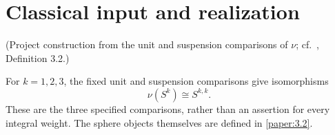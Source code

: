 

\section{Classical input and realization}

\begin{proposition}
\label{sem:Literature:low-sphere-comparisons}
(Project construction from the unit and suspension comparisons of $\nu$;
cf.\ \cite{LWX126}, Definition 3.2.)\par{}

For $k=1,2,3$, the fixed unit and suspension comparisons give isomorphisms
\[\nu(S^k)\cong S^{k,k}.\]
These are the three specified comparisons, rather than an assertion for
every integral weight. The sphere objects themselves are defined in
\ref{paper:3.2}.
\end{proposition}

